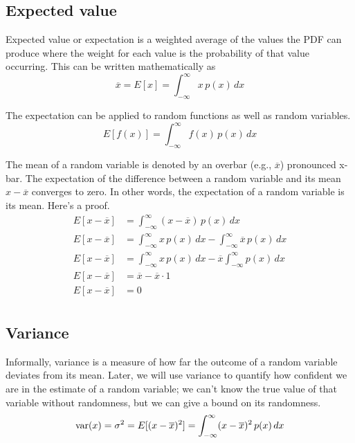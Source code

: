\subsection{Expected value}

Expected value or expectation is a weighted average of the values the PDF can
produce where the weight for each value is the probability of that value
occurring. This can be written mathematically as
\begin{equation*}
  \overline{x} = E[x] = \int_{-\infty}^\infty x \,p(x) \,dx
\end{equation*}

The expectation can be applied to random functions as well as random variables.
\begin{equation*}
  E[f(x)] = \int_{-\infty}^\infty f(x) \,p(x) \,dx
\end{equation*}

The mean of a random variable is denoted by an overbar (e.g., $\overline{x}$)
pronounced x-bar. The expectation of the difference between a random variable
and its mean $x - \overline{x}$ converges to zero. In other words, the
expectation of a random variable is its mean. Here's a proof.
\begin{align*}
  E[x - \overline{x}] &= \int_{-\infty}^\infty (x - \overline{x}) \,p(x) \,dx \\
  E[x - \overline{x}] &= \int_{-\infty}^\infty x \, p(x) \,dx -
    \int_{-\infty}^\infty \overline{x} \,p(x) \,dx \\
  E[x - \overline{x}] &= \int_{-\infty}^\infty x \,p(x) \,dx -
    \overline{x} \int_{-\infty}^\infty p(x) \,dx \\
  E[x - \overline{x}] &= \overline{x} - \overline{x} \cdot 1 \\
  E[x - \overline{x}] &= 0 \\
\end{align*}

\subsection{Variance}

Informally, variance is a measure of how far the outcome of a random variable
deviates from its mean. Later, we will use variance to quantify how confident we
are in the estimate of a random variable; we can't know the true value of that
variable without randomness, but we can give a bound on its randomness.
\begin{equation*}
  \operatorname{var}(x) = \sigma^2 = E[(x - \overline{x})^2] =
    \int_{-\infty}^{\infty} (x - \overline{x})^2 \,p(x) \,dx
\end{equation*}

